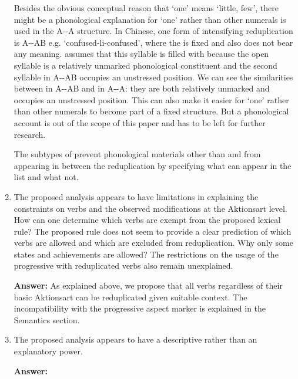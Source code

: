 \documentclass[fleqn,twoside]{article}
\begin{document}
\begin{enumerate}
Besides the obvious conceptual reason that   `one' means `little, few',
there might be a phonological explanation for   `one' rather than other numerals is used in the A--A structure.
In Chinese, one form of intensifying reduplication is A--AB e.g.  `confused-li-confused',
where the  is fixed and also does not bear any meaning.
\citet[137]{Sui2018} assumes that this syllable is filled with  because the open syllable  is a relatively unmarked phonological constituent \citep{Yip1992}
and the second syllable in A--AB occupies an unstressed position.
We can see the similarities between  in A--AB and  in A--A: they are both relatively unmarked and occupies an unstressed position.
This can also make it easier for   `one' rather than other numerals to become part of a fixed structure.
But a phonological account is out of the scope of this paper and has to be left for further research.

The subtypes of  prevent phonological materials other than  and  from appearing in between the reduplication by specifying what can appear in the list and what not.

\item
The proposed analysis appears to have limitations in explaining the constraints on verbs and the observed modifications at the Aktionsart level. How can one determine which verbs are exempt from the proposed lexical rule? The proposed rule does not seem to provide a clear prediction of which verbs are allowed and which are excluded from reduplication. Why only some states and achievements are allowed? The restrictions on the usage of the progressive with reduplicated verbs also remain unexplained.

\textbf{Answer:}
As explained above, we propose that all verbs regardless of their basic Aktionsart can be reduplicated given suitable context.
The incompatibility with the progressive aspect marker is explained in the Semantics section.

\item
The proposed analysis appears to have a descriptive rather than an explanatory power.

\textbf{Answer:} 


\end{enumerate}
\end{document}
